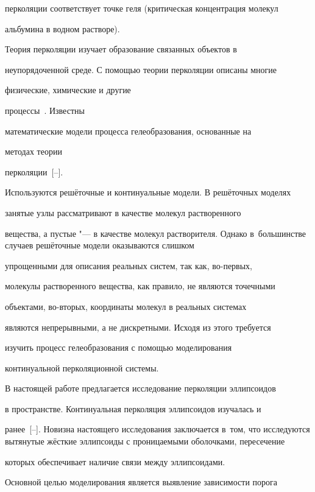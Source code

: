 перколяции соответствует точке геля (критическая концентрация молекул

альбумина в водном растворе).



Теория перколяции изучает образование связанных объектов в

неупорядоченной среде. С помощью теории перколяции описаны многие

физические, химические и другие

процессы~\cite{Stauffer,Sahimi}. Известны

математические модели процесса гелеобразования, основанные на

методах теории

перколяции~[--].

Используются решёточные и континуальные модели. В решёточных моделях

занятые узлы рассматривают в качестве молекул растворенного

вещества, а пустые "--- в качестве молекул растворителя. Однако в~большинстве случаев решёточные модели оказываются слишком

упрощенными для описания реальных систем, так как, во-первых,

молекулы растворенного вещества, как правило, не являются точечными

объектами, во-вторых, координаты молекул в реальных системах

являются непрерывными, а не дискретными. Исходя из этого требуется

изучить процесс гелеобразования с помощью моделирования

континуальной перколяционной системы.



В настоящей работе предлагается исследование перколяции эллипсоидов

в пространстве. Континуальная перколяция эллипсоидов изучалась и

ранее~[--]. Новизна настоящего исследования заключается в~том, что исследуются вытянутые жёсткие эллипсоиды с проницаемыми оболочками, пересечение

которых обеспечивает наличие связи между эллипсоидами.



\smallskip




Основной целью моделирования является выявление зависимости порога

